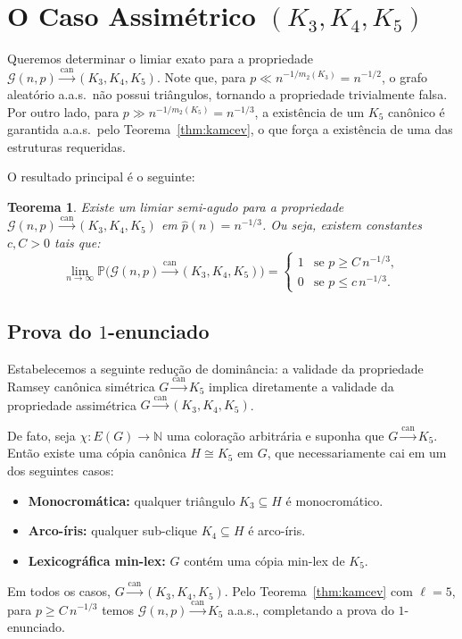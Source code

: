 \documentclass[reqno, 12pt]{amsart}
\numberwithin{equation}{section}
\theoremstyle{plain}
\newtheorem{theorem}{Teorema}[section]
\theoremstyle{definition}
\newcommand{\Gnp}{\mathcal{G}(n,p)}
\newcommand{\mdens}{m_2}
\newcommand{\whp}{a.a.s.}
\begin{document}
\section{O Caso Assimétrico \texorpdfstring{$(K_3, K_4, K_5)$}{(K3, K4, K5)}}
\label{sec:k3k4k5}

Queremos determinar o limiar exato para a propriedade
$\Gnp \xrightarrow{\mathrm{can}} (K_3, K_4, K_5)$.
Note que, para $p \ll n^{-1/\mdens(K_3)} = n^{-1/2}$, o grafo aleatório \whp\ não
possui triângulos, tornando a propriedade trivialmente falsa.
Por outro lado, para $p \gg n^{-1/\mdens(K_5)} = n^{-1/3}$, a existência de um
$K_5$ canônico é garantida \whp\ pelo Teorema~\ref{thm:kamcev}, o que força a
existência de uma das estruturas requeridas.

O resultado principal é o seguinte:

\begin{theorem}
  \label{thm:main-can}
  Existe um limiar semi-agudo para a propriedade
  $\Gnp \xrightarrow{\mathrm{can}} (K_3, K_4, K_5)$ em $\hat{p}(n) = n^{-1/3}$.
  Ou seja, existem constantes $c, C > 0$ tais que:
  \[
    \lim_{n \to \infty} \mathbb{P}\!\bigl(\Gnp \xrightarrow{\mathrm{can}} (K_3,K_4,K_5)\bigr) =
    \begin{cases}
      1 & \text{se } p \ge C\, n^{-1/3}, \\
      0 & \text{se } p \le c\, n^{-1/3}.
    \end{cases}
  \]
\end{theorem}

\subsection{Prova do \texorpdfstring{$1$}{1}-enunciado}

Estabelecemos a seguinte redução de dominância:
a validade da propriedade Ramsey canônica simétrica $G \xrightarrow{\mathrm{can}} K_5$
implica diretamente a validade da propriedade assimétrica
$G \xrightarrow{\mathrm{can}} (K_3, K_4, K_5)$.

De fato, seja $\chi: E(G) \to \mathbb{N}$ uma coloração arbitrária e suponha que
$G \xrightarrow{\mathrm{can}} K_5$. Então existe uma cópia canônica $H \cong K_5$ em $G$,
que necessariamente cai em um dos seguintes casos:
\begin{itemize}
  \item \textbf{Monocromática:} qualquer triângulo $K_3 \subseteq H$ é monocromático.
  \item \textbf{Arco-íris:} qualquer sub-clique $K_4 \subseteq H$ é arco-íris.
  \item \textbf{Lexicográfica min-lex:} $G$ contém uma cópia min-lex de $K_5$.
\end{itemize}
Em todos os casos, $G \xrightarrow{\mathrm{can}} (K_3, K_4, K_5)$.
Pelo Teorema~\ref{thm:kamcev} com $\ell = 5$, para $p \ge C\, n^{-1/3}$ temos
$\Gnp \xrightarrow{\mathrm{can}} K_5$ \whp, completando a prova do $1$-enunciado.
\end{document}
